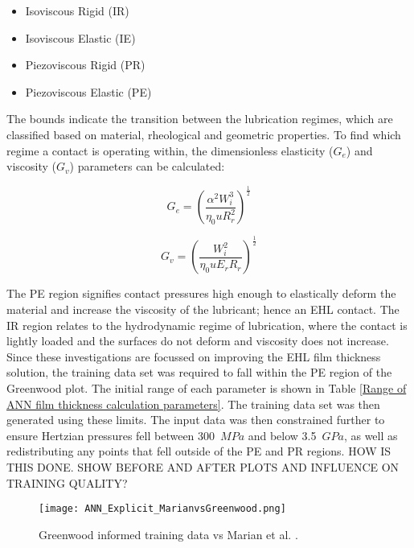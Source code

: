 \begin{itemize}
	\item Isoviscous Rigid (IR)
	\item Isoviscous Elastic (IE)
	\item Piezoviscous Rigid (PR)
	\item Piezoviscous Elastic (PE)
\end{itemize}

The bounds indicate the transition between the lubrication regimes, which are classified based on material, rheological and geometric properties. To find which regime a contact is operating within, the dimensionless elasticity ($G_e$) and viscosity ($G_v$) parameters can be calculated:

\begin{equation}\label{G_e}
	G_e=\left(\frac{\alpha^2 W_i^3}{\eta_0 u R_r^2}\right)^{\frac{1}{2}}
\end{equation}

\begin{equation}\label{G_v}
	G_v=\left(\frac{W_i^2}{\eta_0 u E_r R_r}\right)^{\frac{1}{2}}
\end{equation}

The PE region signifies contact pressures high enough to elastically deform the material and increase the viscosity of the lubricant; hence an EHL contact. The IR region relates to the hydrodynamic regime of lubrication, where the contact is lightly loaded and the surfaces do not deform and viscosity does not increase. Since these investigations are focussed on improving the EHL film thickness solution, the training data set was required to fall within the PE region of the Greenwood plot. The initial range of each parameter is shown in Table \ref{Range of ANN film thickness calculation parameters}. The training data set was then generated using these limits. The input data was then constrained further to ensure Hertzian pressures fell between 300~$MPa$ and below 3.5~$GPa$, as well as redistributing any points that fell outside of the PE and PR regions. HOW IS THIS DONE. SHOW BEFORE AND AFTER PLOTS AND INFLUENCE ON TRAINING QUALITY?

\begin{figure}  
	\texttt{[image: ANN\_Explicit\_MarianvsGreenwood.png]}
	\caption[Greenwood informed training data vs Marian et al.]{Greenwood informed training data vs Marian et al. \cite{Marian2022}.}
	\label{Greenwood informed training data vs Marian et al.}
\end{figure} 

